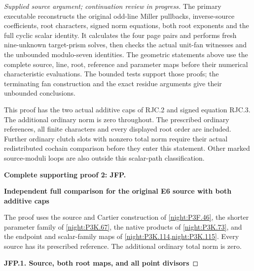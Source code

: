 \begin{proof}[Supplied source argument; continuation review in progress]
The primary executable reconstructs
the original odd-line Miller
pullbacks, inverse-source
coefficients, root characters,
signed norm equations, both
root exponents and the full
cyclic scalar identity.
It calculates the four page
pairs and performs fresh
nine-unknown target-prism solves,
then checks the actual unit-fan
witnesses and the unbounded
modulo-seven identities.
The geometric statements above
use the complete source, line,
root, reference and parameter
maps before their numerical
characteristic evaluations.
The bounded tests support those
proofs; the terminating fan
construction and the exact
residue arguments give their
unbounded conclusions.

This proof has the two actual
additive caps of RJC.2 and
signed equation RJC.3. The
additional ordinary norm is
zero throughout. The prescribed
ordinary references, all finite
characters and every displayed
root order are included.
Further ordinary clutch slots
with nonzero total norm require
their actual redistributed
cochain comparison before they
enter this statement. Other
marked source-moduli loops are
also outside this scalar-path
classification.



\par\bigskip\noindent\textbf{Complete supporting proof 2: JFP.}\par


\par

\medskip\noindent\textbf{Independent full comparison for the original E6 source with both additive caps}

\par\nobreak

The proof uses the source and Cartier construction of
\cref{night:P3F.46}, the shorter parameter family of
\cref{night:P3K.67}, the native products of \cref{night:P3K.73},
and the endpoint and scalar-family maps of
\cref{night:P3K.114,night:P3K.115}. Every source has its prescribed
reference. The additional ordinary total norm is zero.

\par

\medskip\noindent\textbf{JFP.1. Source, both root maps, and all point divisors}

\par\nobreak


\end{proof}
